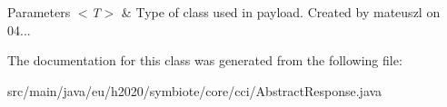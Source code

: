 \begin{DoxyParams}{Parameters}
{\em $<$\+T$>$} & Type of class used in payload. Created by mateuszl on 04... \\
\hline
\end{DoxyParams}


The documentation for this class was generated from the following file\+:\begin{DoxyCompactItemize}
\item 
src/main/java/eu/h2020/symbiote/core/cci/Abstract\+Response.\+java\end{DoxyCompactItemize}
